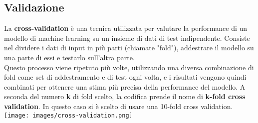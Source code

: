 \documentclass{article}
\begin{document}
        \subsection{Validazione}
        La \textbf{cross-validation} è una tecnica utilizzata per valutare la performance di un modello di machine learning su un insieme di dati di test indipendente. Consiste nel dividere i dati di input in più parti (chiamate "fold"), addestrare il modello su una parte di essi e testarlo sull'altra parte.\\ Questo processo viene ripetuto più volte, utilizzando una diversa combinazione di fold come set di addestramento e di test ogni volta, e i risultati vengono quindi combinati per ottenere una stima più precisa della performance del modello. A seconda del numero \textbf{k} di fold scelto, la codifica prende il nome di \textbf{k-fold cross validation}.\newline
        In questo caso si è scelto di usare una 10-fold cross validation.\newline\\
        \texttt{[image: images/cross-validation.png]}
        \newpage
\end{document}
